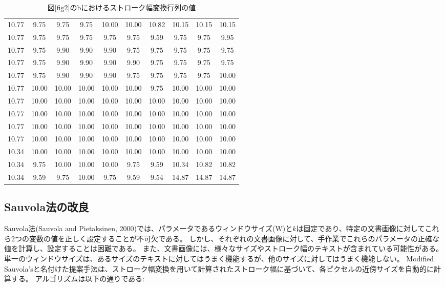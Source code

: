 \documentclass[uplatex, twocolumn,10pt]{jsarticle}
\begin{document}
\begin{table*}[tp]
    \centering
    \caption{図\ref{fig2}のbにおけるストローク幅変換行列の値}
    \label{table2}
    \begin{tabular}{cccccccccc}
        \hline
        10.77 & 9.75  & 9.75  & 9.75  & 10.00 & 10.00 & 10.82 & 10.15 & 10.15 & 10.15 \\
        10.77 & 9.75  & 9.75  & 9.75  & 9.75  & 9.75  & 9.59  & 9.75  & 9.75  & 9.95  \\
        10.77 & 9.75  & 9.90  & 9.90  & 9.90  & 9.75  & 9.75  & 9.75  & 9.75  & 9.75  \\ 
        10.77 & 9.75  & 9.90  & 9.90  & 9.90  & 9.90  & 9.75  & 9.75  & 9.75  & 9.75  \\
        10.77 & 9.75  & 9.90  & 9.90  & 9.90  & 9.75  & 9.75  & 9.75  & 9.75  & 10.00 \\
        10.77 & 10.00 & 10.00 & 10.00 & 10.00 & 10.00 & 9.75  & 10.00 & 10.00 & 10.00 \\
        10.77 & 10.00 & 10.00 & 10.00 & 10.00 & 10.00 & 10.00 & 10.00 & 10.00 & 10.00 \\
        10.77 & 10.00 & 10.00 & 10.00 & 10.00 & 10.00 & 10.00 & 10.00 & 10.00 & 10.00 \\
        10.77 & 10.00 & 10.00 & 10.00 & 10.00 & 10.00 & 10.00 & 10.00 & 10.00 & 10.00 \\
        10.77 & 10.00 & 10.00 & 10.00 & 10.00 & 10.00 & 10.00 & 10.00 & 10.00 & 10.00 \\
        10.34 & 10.00 & 10.00 & 10.00 & 10.00 & 10.00 & 10.00 & 10.00 & 10.00 & 10.00 \\
        10.34 & 9.75  & 10.00 & 10.00 & 10.00 & 9.75  & 9.59  & 10.34 & 10.82 & 10.82 \\
        10.34 & 9.59  & 9.75  & 10.00 & 9.75  & 9.59  & 9.54  & 14.87 & 14.87 & 14.87 \\
        \hline
    \end{tabular}
\end{table*}


\subsection{Sauvola法の改良}

Sauvola法(Sauvola and Pietaksinen, 2000)では、パラメータであるウィンドウサイズ(W)と$k$は固定であり、特定の文書画像に対してこれら2つの変数の値を正しく設定することが不可欠である。
しかし、それぞれの文書画像に対して、手作業でこれらのパラメータの正確な値を計算し、設定することは困難である。
また、文書画像には、様々なサイズやストローク幅のテキストが含まれている可能性がある。
単一のウィンドウサイズは、あるサイズのテキストに対してはうまく機能するが、他のサイズに対してはうまく機能しない。
Modified Sauvola'sと名付けた提案手法は、ストローク幅変換を用いて計算されたストローク幅に基づいて、各ピクセルの近傍サイズを自動的に計算する。
アルゴリズムは以下の通りである:
\end{document}
